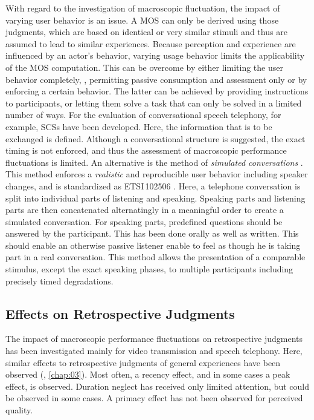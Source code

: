 With regard to the investigation of macroscopic fluctuation, the impact of varying user behavior is an issue.
A \ac{MOS} can only be derived using those judgments, which are based on identical or very similar stimuli and thus are assumed to lead to similar experiences.
Because perception and experience are influenced by an actor's behavior, varying usage behavior limits the applicability of the \ac{MOS} computation.
This can be overcome by either limiting the user behavior completely, \ie, permitting passive consumption and assessment only or by enforcing a certain behavior.
The latter can be achieved by providing instructions to participants, or letting them solve a task that can only be solved in a limited number of ways.
For the evaluation of conversational speech telephony, for example, \acp{SCS} have been developed.
Here, the information that is to be exchanged is defined.
Although a conversational structure is suggested, the exact timing is not enforced, and thus the assessment of macroscopic performance fluctuations is limited.
An alternative is the method of \emph{simulated conversations} \citep{weiss_modeling_2009, berger_estimation_2008}.
This method enforces a \emph{realistic} and reproducible user behavior including speaker changes, and is standardized as ETSI\,102506 \citep{etsi_speech_2011}.
Here, a telephone conversation is split into individual parts of listening and speaking.
Speaking parts and listening parts are then concatenated alternatingly in a meaningful order to create a simulated conversation.
For speaking parts, predefined questions should be answered by the participant.
This has been done orally as well as written.
This should enable an otherwise passive listener enable to feel as though he is taking part in a real conversation.
This method allows the presentation of a comparable stimulus, except the exact speaking phases, to multiple participants including precisely timed degradations.

\subsection{Effects on Retrospective Judgments}
The impact of macroscopic performance fluctuations on retrospective judgments has been investigated mainly for video transmission and speech telephony.
Here, similar effects to retrospective judgments of general experiences have been observed (\cf, \autoref{chap:03}).
Most often, a recency effect, and in some cases a peak effect, is observed.
Duration neglect has received only limited attention, but could be observed in some cases.
A primacy effect has not been observed for perceived quality.

